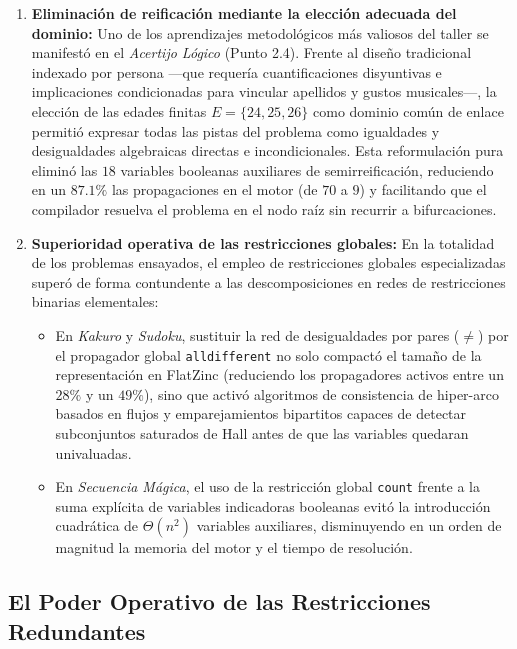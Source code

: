 \begin{enumerate}
    \item \textbf{Eliminación de reificación mediante la elección adecuada del dominio:}
    Uno de los aprendizajes metodológicos más valiosos del taller se manifestó en el \textit{Acertijo Lógico} (Punto 2.4). Frente al diseño tradicional indexado por persona —que requería cuantificaciones disyuntivas e implicaciones condicionadas para vincular apellidos y gustos musicales—, la elección de las edades finitas $E = \{24, 25, 26\}$ como dominio común de enlace permitió expresar todas las pistas del problema como igualdades y desigualdades algebraicas directas e incondicionales. Esta reformulación pura eliminó las $18$ variables booleanas auxiliares de semirreificación, reduciendo en un $87.1\%$ las propagaciones en el motor (de $70$ a $9$) y facilitando que el compilador resuelva el problema en el nodo raíz sin recurrir a bifurcaciones.
    
    \item \textbf{Superioridad operativa de las restricciones globales:}
    En la totalidad de los problemas ensayados, el empleo de restricciones globales especializadas superó de forma contundente a las descomposiciones en redes de restricciones binarias elementales:
    \begin{itemize}
        \item En \textit{Kakuro} y \textit{Sudoku}, sustituir la red de desigualdades por pares ($\neq$) por el propagador global \texttt{alldifferent} no solo compactó el tamaño de la representación en FlatZinc (reduciendo los propagadores activos entre un $28\%$ y un $49\%$), sino que activó algoritmos de consistencia de hiper-arco basados en flujos y emparejamientos bipartitos capaces de detectar subconjuntos saturados de Hall antes de que las variables quedaran univaluadas.
        \item En \textit{Secuencia Mágica}, el uso de la restricción global \texttt{count} frente a la suma explícita de variables indicadoras booleanas evitó la introducción cuadrática de $\Theta(n^2)$ variables auxiliares, disminuyendo en un orden de magnitud la memoria del motor y el tiempo de resolución.
    \end{itemize}
\end{enumerate}

\subsection{El Poder Operativo de las Restricciones Redundantes}

